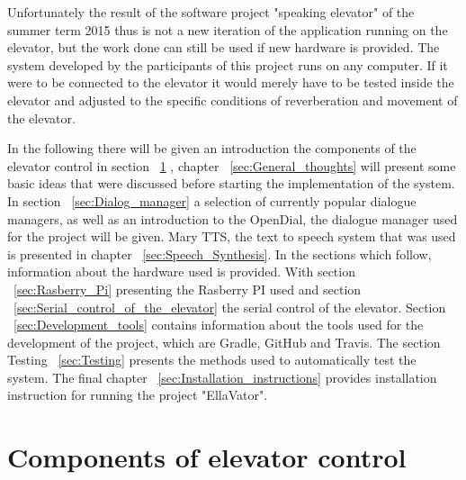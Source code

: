 \documentclass[a4paper, 12pt]{article}
\begin{document}
Unfortunately the result of the software project "speaking elevator" of the summer term 2015 thus is not a new iteration of the application running on the elevator, but the work done can still be used if new hardware is provided.
The system developed by the participants of this project runs on any computer.
If it were to be connected to the elevator it would merely have to be tested inside the elevator and adjusted to the specific conditions of reverberation and movement of the elevator. \newline

In the following there will be given an introduction the components of the elevator control in section  ~\ref{sec:Components_of_elevator_control} , chapter ~\ref{sec:General_thoughts} will present some basic ideas that were discussed before starting the implementation of the system.
In section ~\ref{sec:Dialog_manager} a selection of currently popular dialogue managers, as well as an introduction to the OpenDial, the dialogue manager used for the project will be given.
Mary TTS, the text to speech system that was used is presented in chapter ~\ref{sec:Speech_Synthesis}. \newline
In the sections which follow, information about the hardware used is provided.
With section ~\ref{sec:Rasberry_Pi} presenting the Rasberry PI used and section ~\ref{sec:Serial_control_of_the_elevator} the serial control of the elevator.
Section ~\ref{sec:Development_tools} contains information about the tools used for the development of the project, which are Gradle, GitHub and Travis.
The section Testing ~\ref{sec:Testing} presents the methods used to automatically test the system.
The final chapter ~\ref{sec:Installation_instructions} provides installation instruction for running the project "EllaVator".


\section{Components of elevator control}
\label{sec:Components_of_elevator_control}
\end{document}
